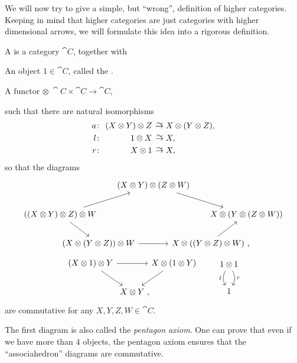 We will now try to give a simple, but ``wrong'',
definition of higher categories.
Keeping in mind that higher categories
are just categories with higher dimensional arrows,
we will formulate this idea into a rigorous definition.

\begin{definition}
    A  is a category $\cat C$, together with
    \begin{itms}
        \item An object $1\in\cat C$, called the .
        \item A functor $\otimes\:\cat C\times\cat C\to\cat C$,
    \end{itms}
    such that there are natural isomorphisms
    \[\setlength{\arraycolsep}{.2em} \begin{array}{rrl}
        a\:&(X\otimes Y)\otimes Z&\simto X\otimes(Y\otimes Z),\\[3pt]
        l\:&1\otimes X&\simto X,\\[3pt]
        r\:&X\otimes 1&\simto X,
    \end{array} \]
    so that the diagrams
    \[ \begin{tikzcd}[column sep=-5em]
        & & \hspace*{2em}(X\otimes Y)\otimes(Z\otimes W)\hspace*{2em}\ar[rrd] \\
        ((X\otimes Y)\otimes Z)\otimes W\ar[rru]\ar[dr] &&&& X\otimes(Y\otimes(Z\otimes W))\\
        & (X\otimes (Y\otimes Z))\otimes W\ar[rr] && X\otimes((Y\otimes Z)\otimes W)\rlap{\ ,}\ar[ur]
    \end{tikzcd} \]
    \[ \begin{tikzcd}[column sep=0]
        (X\otimes 1)\otimes Y\ar[dr]\ar[rr]&&X\otimes(1\otimes Y)\ar[dl]\\
        &X\otimes Y\rlap{\ ,}
    \end{tikzcd}
    \qquad
    \begin{tikzcd}
        1\otimes 1\ar[d,bend left,"r"]\ar[d,bend right,"l"'] \\ 1
    \end{tikzcd}
    \]
    are commutative for any $X,Y,Z,W\in\cat C$.
\end{definition}

The first diagram is also called the \emph{pentagon axiom}.
One can prove that even if we have more than $4$ objects,
the pentagon axiom ensures that the ``associahedron'' diagrams are commutative.

